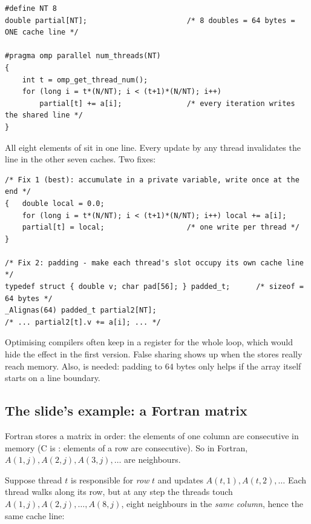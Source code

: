 \begin{lstlisting}
#define NT 8
double partial[NT];                       /* 8 doubles = 64 bytes = ONE cache line */

#pragma omp parallel num_threads(NT)
{
    int t = omp_get_thread_num();
    for (long i = t*(N/NT); i < (t+1)*(N/NT); i++)
        partial[t] += a[i];               /* every iteration writes the shared line */
}
\end{lstlisting}

All eight elements of  sit in one line. Every update by any thread invalidates the line in the other seven caches.
Two fixes:

\begin{lstlisting}
/* Fix 1 (best): accumulate in a private variable, write once at the end */
{   double local = 0.0;
    for (long i = t*(N/NT); i < (t+1)*(N/NT); i++) local += a[i];
    partial[t] = local;                   /* one write per thread */
}

/* Fix 2: padding - make each thread's slot occupy its own cache line */
typedef struct { double v; char pad[56]; } padded_t;      /* sizeof = 64 bytes */
_Alignas(64) padded_t partial2[NT];
/* ... partial2[t].v += a[i]; ... */
\end{lstlisting}

\begin{pitfall}
Optimising compilers often keep  in a register for the whole loop, which would hide the effect in the first
version. False sharing shows up when the stores really reach memory. Also,  is needed: padding to $64$ bytes
only helps if the array itself starts on a line boundary.
\end{pitfall}

\subsection{The slide's example: a Fortran matrix}

Fortran stores a matrix in  order: the elements of one column are consecutive in memory
(C is : elements of a row are consecutive). So in Fortran, $A(1,j), A(2,j), A(3,j),\dots$ are neighbours.

Suppose thread $t$ is responsible for \emph{row} $t$ and updates $A(t,1), A(t,2),\ldots$ Each thread walks along its row, but
at any step the threads touch $A(1,j), A(2,j),\ldots, A(8,j)$, eight neighbours in the \emph{same column}, hence the same cache line:

